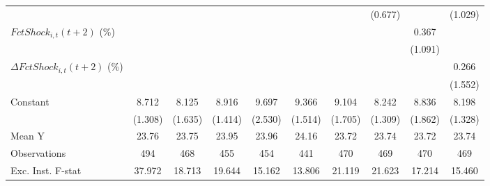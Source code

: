 {\begin{tabular}{l*{9}{c}}
                    &                     &                     &                     &                     &                     &                     &     (0.677)         &                     &     (1.029)         \\
\addlinespace
$ FctShock_{i,t}(t+2)$ (\%)&                     &                     &                     &                     &                     &                     &                     &       0.367         &                     \\
                    &                     &                     &                     &                     &                     &                     &                     &     (1.091)         &                     \\
\addlinespace
$ \Delta FctShock_{i,t}(t+2)$ (\%)&                     &                     &                     &                     &                     &                     &                     &                     &       0.266         \\
                    &                     &                     &                     &                     &                     &                     &                     &                     &     (1.552)         \\
\addlinespace
Constant            &       8.712\sym{***}&       8.125\sym{***}&       8.916\sym{***}&       9.697\sym{***}&       9.366\sym{***}&       9.104\sym{***}&       8.242\sym{***}&       8.836\sym{***}&       8.198\sym{***}\\
                    &     (1.308)         &     (1.635)         &     (1.414)         &     (2.530)         &     (1.514)         &     (1.705)         &     (1.309)         &     (1.862)         &     (1.328)         \\
\midrule
Mean Y              &       23.76         &       23.75         &       23.95         &       23.96         &       24.16         &       23.72         &       23.74         &       23.72         &       23.74         \\
Observations        &         494         &         468         &         455         &         454         &         441         &         470         &         469         &         470         &         469         \\
Exc. Inst. F-stat   &      37.972         &      18.713         &      19.644         &      15.162         &      13.806         &      21.119         &      21.623         &      17.214         &      15.460         \\
\bottomrule
\end{tabular}
}
